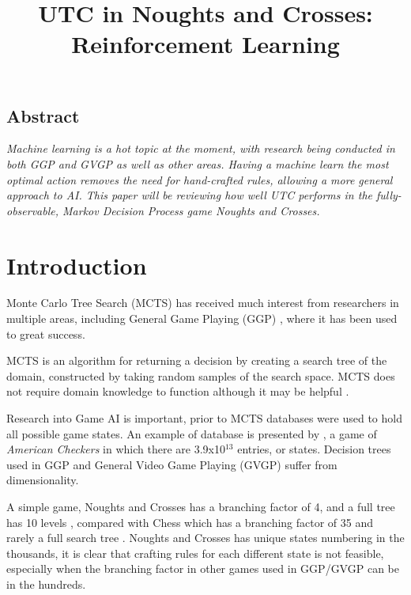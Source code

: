 \documentclass[conference]{IEEEtran}
\begin{document}
\date{}

\title{\Large\bf UTC in Noughts and Crosses: Reinforcement Learning}

\author{
}
 
\maketitle
\thispagestyle{empty}

\subsection*{\centering Abstract}
{\em
Machine learning is a hot topic at the moment, with research being conducted in both GGP and GVGP as well as other areas. Having a machine learn the most optimal action removes the need for hand-crafted rules, allowing a more general approach to AI. This paper will be reviewing how well UTC performs in the fully-observable, Markov Decision Process game Noughts and Crosses.
}

\section{Introduction}
Monte Carlo Tree Search (MCTS) has received much interest from researchers in multiple areas, including General Game Playing (GGP) \cite{sironi},  where it has been used to great success.

MCTS is an algorithm for returning a decision by creating a search tree of the domain, constructed by taking random samples of the search space. MCTS does not require domain knowledge to function although it may be helpful \cite{sironi}.

Research into Game AI is important, prior to MCTS databases were used to hold all possible game states. An example of database is presented by \cite{evomcts}, a game of {\em American Checkers} in which there are 3.9x10$^{13}$ entries, or states. Decision trees used in GGP and General Video Game Playing (GVGP) suffer from dimensionality. 

A simple game, Noughts and Crosses has a branching factor of 4, and a full tree has 10 levels \cite{bartle}, compared with Chess which has a branching factor of 35 and rarely a full search tree \cite{bartle}. Noughts and Crosses has unique states numbering in the thousands, it is clear that crafting rules for each different state is not feasible, especially when the branching factor in other games used in GGP/GVGP can be in the hundreds. 
\end{document}
